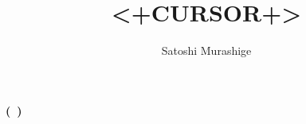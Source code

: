 \documentclass[10pt, a4paper, dvipdfmx]{jsarticle}
\title{<+CURSOR+>}\let\Title\@title
\author{Satoshi Murashige}\let\Author\@author
\date{\number\year.\number\date.\number\day}\let\Date\@date
\begin{document}
	\begin{flushleft}
		\textbf{\Title\hfill(\Date\ \Author)}
	\end{flushleft}
\end{document}
